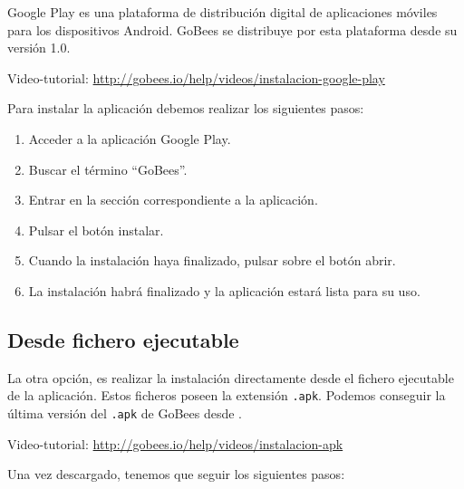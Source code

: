 Google Play es una plataforma de distribución digital de aplicaciones
móviles para los dispositivos Android. GoBees se distribuye por esta
plataforma desde su versión 1.0.


Video-tutorial:
\url{http://gobees.io/help/videos/instalacion-google-play}

Para instalar la aplicación debemos realizar los siguientes pasos:

\begin{enumerate}
\def\labelenumi{\arabic{enumi}.}
\tightlist
\item
  Acceder a la aplicación Google Play.
\item
  Buscar el término ``GoBees''.
\item
  Entrar en la sección correspondiente a la aplicación.
\item
  Pulsar el botón instalar.
\item
  Cuando la instalación haya finalizado, pulsar sobre el botón abrir.
\item
  La instalación habrá finalizado y la aplicación estará lista para su
  uso.
\end{enumerate}


\subsection{Desde fichero ejecutable}\label{desde-fichero-ejecutable}

La otra opción, es realizar la instalación directamente desde el fichero
ejecutable de la aplicación. Estos ficheros poseen la extensión
\texttt{.apk}. Podemos conseguir la última versión del \texttt{.apk} de
GoBees desde \citep{github:gobees_apk}.

Video-tutorial: \url{http://gobees.io/help/videos/instalacion-apk}

Una vez descargado, tenemos que seguir los siguientes pasos:

